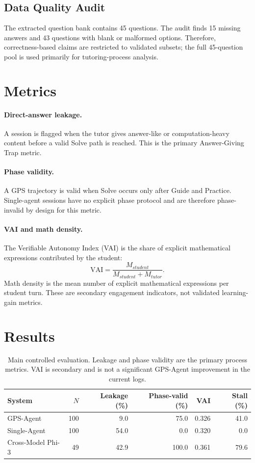 \documentclass[11pt]{article}
\begin{document}
\subsection{Data Quality Audit}
The extracted question bank contains 45 questions. The audit finds 15 missing answers and 43 questions with blank or malformed options. Therefore, correctness-based claims are restricted to validated subsets; the full 45-question pool is used primarily for tutoring-process analysis.

\section{Metrics}
\paragraph{Direct-answer leakage.} A session is flagged when the tutor gives answer-like or computation-heavy content before a valid Solve path is reached. This is the primary Answer-Giving Trap metric.

\paragraph{Phase validity.} A GPS trajectory is valid when Solve occurs only after Guide and Practice. Single-agent sessions have no explicit phase protocol and are therefore phase-invalid by design for this metric.

\paragraph{VAI and math density.} The Verifiable Autonomy Index (VAI) is the share of explicit mathematical expressions contributed by the student:
\begin{equation}
\mathrm{VAI} = \frac{M_{student}}{M_{student} + M_{tutor}}.
\end{equation}
Math density is the mean number of explicit mathematical expressions per student turn. These are secondary engagement indicators, not validated learning-gain metrics.

\section{Results}
\begin{table}[t]
\centering
\small
\begin{tabular}{lrrrrr}
\toprule
System & $N$ & Leakage (\%) & Phase-valid (\%) & VAI & Stall (\%) \\
\midrule
GPS-Agent & 100 & 9.0 & 75.0 & 0.326 & 41.0 \\
Single-Agent & 100 & 54.0 & 0.0 & 0.320 & 0.0 \\
Cross-Model Phi-3 & 49 & 42.9 & 100.0 & 0.361 & 79.6 \\
\bottomrule
\end{tabular}
\caption{Main controlled evaluation. Leakage and phase validity are the primary process metrics. VAI is secondary and is not a significant GPS-Agent improvement in the current logs.}
\label{tab:main}
\end{table}
\end{document}

